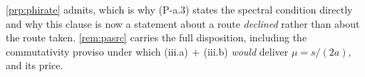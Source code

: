 \begin{lemma}
\begin{enumerate}
\begin{enumerate}
{%
\cref{prp:phirate} admits}, which is why (P-a.3) states the spectral condition directly and why this
clause is now a statement about a route \emph{declined} rather than about the route taken.
\cref{rem:pasrc} carries the full disposition, including the commutativity proviso under which
(iii.a)$\,+\,$(iii.b) \emph{would} deliver $\mu=s/(2a)$, and its price.
\end{enumerate}
\end{enumerate}
\end{lemma}

